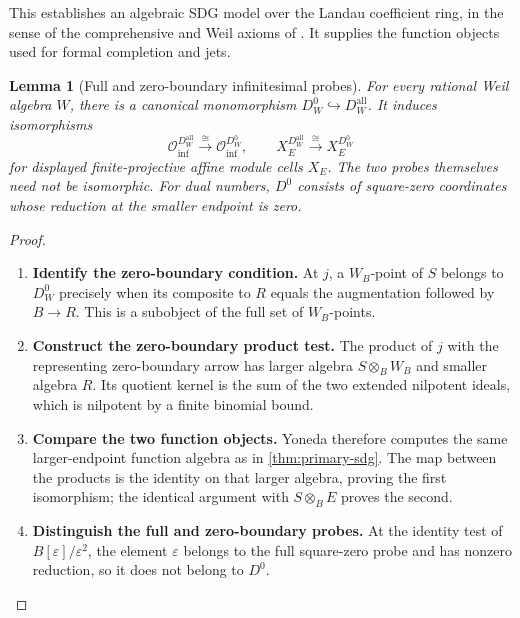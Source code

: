 \documentclass[11pt,a4paper]{article}
\numberwithin{algorithm}{section}
\numberwithin{equation}{section}
\newtheorem{lemma}[lemma]{Lemma}
\theoremstyle{definition}
\theoremstyle{remark}
\theoremstyle{plain}
\newcommand{\incl}{\hookrightarrow}
\newcommand{\eps}{\varepsilon}
\theoremstyle{definition}
\theoremstyle{plain}
\begin{document}
This establishes an algebraic SDG model over the Landau coefficient
ring, in the sense of the comprehensive and Weil axioms of
\citep[Sections I.12, I.16, III.1 and Appendix D]{Kock}.
It supplies the function objects used for formal completion and jets.

\begin{lemma}[Full and zero-boundary infinitesimal probes]
\label{lem:primary-probe-comparison}
For every rational Weil algebra $W$, there is a canonical monomorphism
$D_W^0\incl D_W^{\mathrm{all}}$.  It induces isomorphisms
\begin{equation}\label{eq:primary-boundary-kl}
 \mathcal O_{\mathrm{inf}}^{D_W^{\mathrm{all}}}
 \xrightarrow{\ \cong\ }\mathcal O_{\mathrm{inf}}^{D_W^0},
 \qquad
 X_E^{D_W^{\mathrm{all}}}\xrightarrow{\ \cong\ }X_E^{D_W^0}
\end{equation}
for displayed finite-projective affine module cells $X_E$.
The two probes themselves need not be isomorphic.  For dual numbers,
$D^0$ consists of square-zero coordinates whose reduction at the
smaller endpoint is zero.
\end{lemma}
\begin{proof}\leavevmode
\begin{enumerate}[leftmargin=*,align=left]
\item \textbf{Identify the zero-boundary condition.}
At $j$, a $W_B$-point of $S$ belongs to $D_W^0$ precisely when
its composite to $R$ equals the augmentation followed by $B\to R$.
This is a subobject of the full set of $W_B$-points.

\item \textbf{Construct the zero-boundary product test.}
The product of $j$ with the representing zero-boundary arrow has
larger algebra $S\otimes_BW_B$ and smaller algebra $R$.
Its quotient kernel is the sum of the two extended nilpotent ideals,
which is nilpotent by a finite binomial bound.

\item \textbf{Compare the two function objects.}
Yoneda therefore
computes the same larger-endpoint function algebra as in
\cref{thm:primary-sdg}.  The map between the products is the
identity on that larger algebra, proving the first isomorphism;
the identical argument with $S\otimes_BE$ proves the second.

\item \textbf{Distinguish the full and zero-boundary probes.}
At the identity test of $B[\eps]/\eps^2$, the element $\eps$
belongs to the full square-zero probe and has nonzero reduction,
so it does not belong to $D^0$.
\end{enumerate}
\end{proof}
\end{document}
